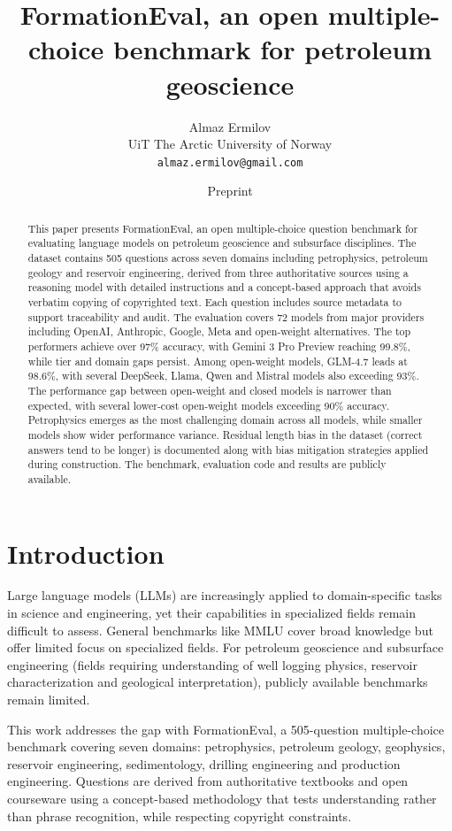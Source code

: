\documentclass[11pt]{article}
\title{FormationEval, an open multiple-choice benchmark for petroleum geoscience}
\author{
Almaz Ermilov\\
UiT The Arctic University of Norway\\
\texttt{almaz.ermilov@gmail.com}
}
\date{Preprint}
\begin{document}
\maketitle

\begin{abstract}
This paper presents FormationEval, an open multiple-choice question benchmark for evaluating language models on petroleum geoscience and subsurface disciplines. The dataset contains 505 questions across seven domains including petrophysics, petroleum geology and reservoir engineering, derived from three authoritative sources using a reasoning model with detailed instructions and a concept-based approach that avoids verbatim copying of copyrighted text. Each question includes source metadata to support traceability and audit. The evaluation covers 72 models from major providers including OpenAI, Anthropic, Google, Meta and open-weight alternatives. The top performers achieve over 97\% accuracy, with Gemini 3 Pro Preview reaching 99.8\%, while tier and domain gaps persist. Among open-weight models, GLM-4.7 leads at 98.6\%, with several DeepSeek, Llama, Qwen and Mistral models also exceeding 93\%. The performance gap between open-weight and closed models is narrower than expected, with several lower-cost open-weight models exceeding 90\% accuracy. Petrophysics emerges as the most challenging domain across all models, while smaller models show wider performance variance. Residual length bias in the dataset (correct answers tend to be longer) is documented along with bias mitigation strategies applied during construction. The benchmark, evaluation code and results are publicly available.
\end{abstract}

\section{Introduction}

Large language models (LLMs) are increasingly applied to domain-specific tasks in science and engineering, yet their capabilities in specialized fields remain difficult to assess. General benchmarks like MMLU \cite{mmlu} cover broad knowledge but offer limited focus on specialized fields. For petroleum geoscience and subsurface engineering (fields requiring understanding of well logging physics, reservoir characterization and geological interpretation), publicly available benchmarks remain limited.

This work addresses the gap with FormationEval, a 505-question multiple-choice benchmark covering seven domains: petrophysics, petroleum geology, geophysics, reservoir engineering, sedimentology, drilling engineering and production engineering. Questions are derived from authoritative textbooks and open courseware using a concept-based methodology that tests understanding rather than phrase recognition, while respecting copyright constraints.
\end{document}
